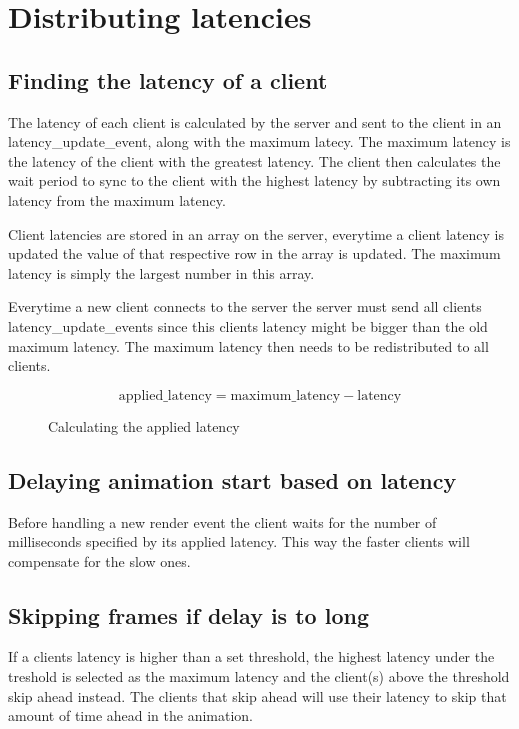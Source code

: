 \section{Distributing latencies}

\subsection{Finding the latency of a client}
The latency of each client is calculated by the server and sent to the client in an latency\_update\_event, along with the maximum latecy. The maximum latency is the latency of the client with the greatest latency. The client then calculates the wait period to sync to the client with the highest latency by subtracting its own latency from the maximum latency.

Client latencies are stored in an array on the server, everytime a client latency is updated the value of that respective row in the array is updated. The maximum latency is simply the largest number in this array.

Everytime a new client connects to the server the server must send all clients latency\_update\_events since this clients latency might be bigger than the old maximum latency. The maximum latency then needs to be redistributed to all clients. 

\begin{figure}[h!]
	\begin{displaymath}
		\text{applied\_latency} = \text{maximum\_latency} - \text{latency}
	\end{displaymath}
	\caption{Calculating the applied latency}
	\label{fig:applatency}
\end{figure} 

\subsection{Delaying animation start based on latency}
Before handling a new render event the client waits for the number of milliseconds specified by its applied latency. This way the faster clients will compensate for the slow ones. 

\subsection{Skipping frames if delay is to long}
If a clients latency is higher than a set threshold, the highest latency under the treshold is selected as the maximum latency and the client(s) above the threshold skip ahead instead. The clients that skip ahead will use their latency to skip that amount of time ahead in the animation. 


